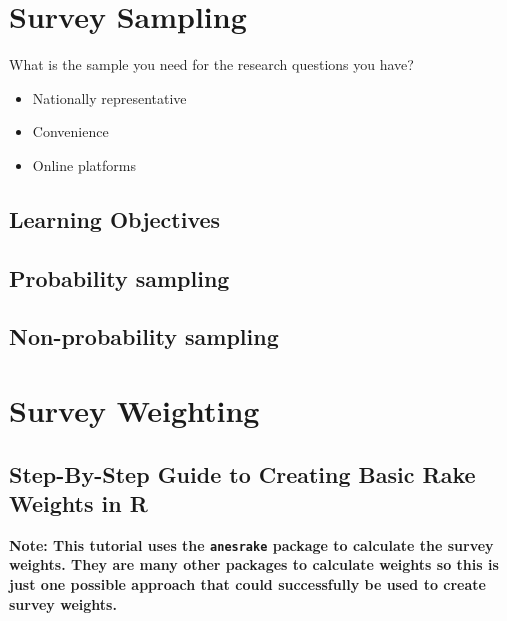 \documentclass[
  letterpaper,
  DIV=11,
  numbers=noendperiod]{scrreprt}
\providecommand{\tightlist}{%
  \setlength{\itemsep}{0pt}\setlength{\parskip}{0pt}}\usepackage{longtable,booktabs,array}
\begin{document}

\hypertarget{survey-sampling}{%
\chapter{Survey Sampling}\label{survey-sampling}}

What is the sample you need for the research questions you have?

\begin{itemize}
\tightlist
\item
  Nationally representative
\item
  Convenience
\item
  Online platforms
\end{itemize}

\hypertarget{learning-objectives-5}{%
\section{Learning Objectives}\label{learning-objectives-5}}

\hypertarget{probability-sampling}{%
\section{Probability sampling}\label{probability-sampling}}

\hypertarget{non-probability-sampling}{%
\section{Non-probability sampling}\label{non-probability-sampling}}


\hypertarget{survey-weighting}{%
\chapter{Survey Weighting}\label{survey-weighting}}

\hypertarget{step-by-step-guide-to-creating-basic-rake-weights-in-r}{%
\section{Step-By-Step Guide to Creating Basic Rake Weights in
R}\label{step-by-step-guide-to-creating-basic-rake-weights-in-r}}

\textbf{Note: This tutorial uses the \texttt{anesrake} package to
calculate the survey weights. They are many other packages to calculate
weights so this is just one possible approach that could successfully be
used to create survey weights.}
\end{document}
